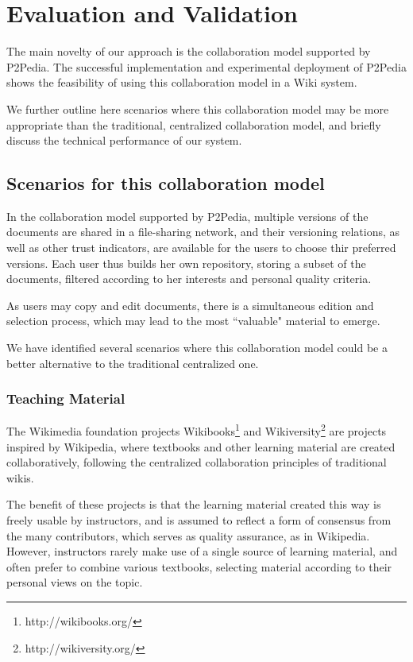 \section{Evaluation and Validation}
\label{sec:evaluation}
The main novelty of our approach is the collaboration model supported by P2Pedia. The successful implementation and experimental deployment of P2Pedia shows the feasibility of using this collaboration model in a Wiki system.

We further outline here scenarios where this collaboration model may be more appropriate than the traditional, centralized collaboration model, and briefly discuss the technical performance of our system.

\subsection{Scenarios for this collaboration model}

In the collaboration model supported by P2Pedia, multiple versions of the documents are shared in a file-sharing network, and their versioning relations, as well as other trust indicators, are available for the users to choose thir preferred versions. Each user thus builds her own repository, storing a subset of the documents, filtered according to her interests and personal quality criteria.

As users may copy and edit documents, there is a simultaneous edition and selection process, which may lead to the most ``valuable" material to emerge.

We have identified several scenarios where this collaboration model could be a better alternative to the traditional centralized one. 

\subsubsection{Teaching Material} 
The Wikimedia foundation projects Wikibooks\footnote{http://wikibooks.org/} and Wikiversity\footnote{http://wikiversity.org/} are projects inspired by Wikipedia, where textbooks and other learning material are created collaboratively, following the centralized collaboration principles of traditional wikis. 

The benefit of these projects is that the learning material created this way is freely usable by instructors, and is assumed to reflect a form of consensus from the many contributors, which serves as quality assurance, as in Wikipedia. However, instructors rarely make use of a single source of learning material, and often prefer to combine various textbooks, selecting material according to their personal views on the topic. 

